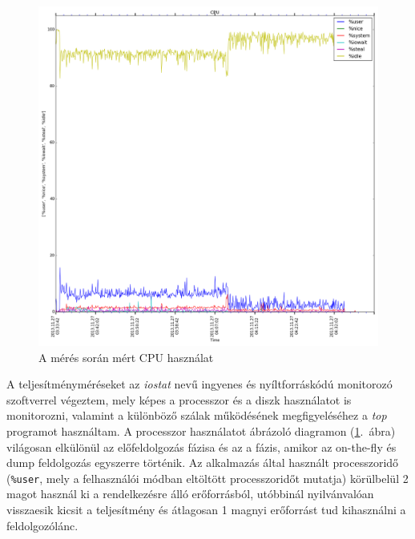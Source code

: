 \begin{figure}[htb]
\centering
\includegraphics[scale=0.3]{img/measurement_cpu}
\caption{A mérés során mért CPU használat}
\label{fig:measurement_cpu}
\end{figure}

A teljesítményméréseket az \textit{iostat} nevű ingyenes és nyíltforráskódú monitorozó szoftverrel végeztem, mely képes a processzor és a diszk használatot is monitorozni, valamint a különböző szálak működésének megfigyeléséhez a \textit{top} programot használtam. A processzor használatot ábrázoló diagramon (\ref{fig:measurement_cpu}.~ábra) világosan elkülönül az előfeldolgozás fázisa és az a fázis, amikor az on-the-fly és dump feldolgozás egyszerre történik. Az alkalmazás által használt processzoridő (\texttt{\%user}, mely a felhasználói módban eltöltött processzoridőt mutatja) körülbelül 2 magot használ ki a rendelkezésre álló erőforrásból, utóbbinál nyilvánvalóan visszaesik kicsit a teljesítmény és átlagosan 1 magnyi erőforrást tud kihasználni a feldolgozólánc.

